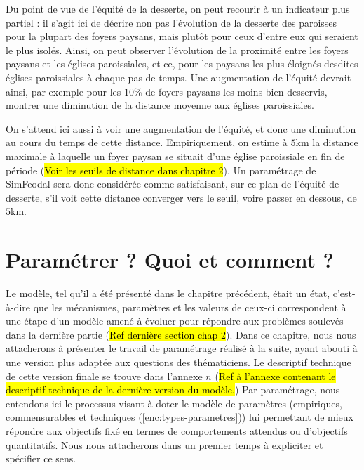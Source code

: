 Du point de vue de l'équité de la desserte, on peut recourir à un indicateur plus partiel : il s'agit ici de décrire non pas l'évolution de la desserte des paroisses pour la plupart des foyers paysans, mais plutôt pour ceux d'entre eux qui seraient le plus isolés.
Ainsi, on peut observer l'évolution de la proximité entre les foyers paysans et les églises paroissiales, et ce, pour les paysans les plus éloignés desdites églises paroissiales à chaque pas de temps.
Une augmentation de l'équité devrait ainsi, par exemple pour les 10\% de foyers paysans les moins bien desservis, montrer une diminution de la distance moyenne aux églises paroissiales.

On s'attend ici aussi à voir une augmentation de l'équité, et donc une diminution au cours du temps de cette distance.
Empiriquement, on estime à $5$km la distance maximale à laquelle un foyer paysan se situait d'une église paroissiale en fin de période (\hl{Voir les seuils de distance dans chapitre 2}).
Un paramétrage de SimFeodal sera donc considérée comme satisfaisant, sur ce plan de l'équité de desserte, s'il voit cette distance converger vers le seuil, voire passer en dessous, de $5$km.



\section{Paramétrer ? Quoi et comment ?}

Le modèle, tel qu'il a été présenté dans le chapitre précédent, était un \og état\fg{}, c'est-à-dire que les mécanismes, paramètres et les valeurs de ceux-ci correspondent à une étape d'un modèle amené à évoluer pour répondre aux problèmes soulevés dans la dernière partie (\hl{Ref dernière section chap 2}).
Dans ce chapitre, nous nous attacherons à présenter le travail de paramétrage réalisé à la suite, ayant abouti à une version plus adaptée aux questions des thématiciens. Le descriptif technique de cette version \og finale\fg{} se trouve dans l'annexe $n$ (\hl{Ref à l'annexe contenant le descriptif technique de la dernière version du modèle.})
Par paramétrage, nous entendons ici le processus visant à doter le modèle de paramètres (empiriques, \og commensurables\fg{} et techniques (\cref{enc:types-parametres})) lui permettant de mieux répondre aux objectifs fixé en termes de comportements attendus ou d'objectifs quantitatifs. Nous nous attacherons dans un premier temps à expliciter et spécifier ce sens.


